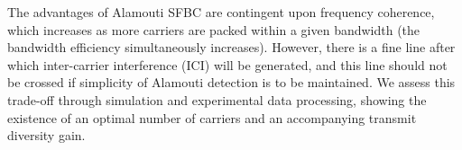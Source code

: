 The advantages of Alamouti SFBC are contingent upon frequency coherence, which increases
as more carriers are packed within a given bandwidth (the bandwidth efficiency simultaneously increases).
However, there is a fine line after which inter-carrier interference (ICI) will be generated,
and this line should not be crossed if simplicity of Alamouti detection is to be maintained. We
assess this trade-off through simulation and experimental data processing, showing the existence
of an optimal number of carriers and an accompanying transmit diversity gain.
